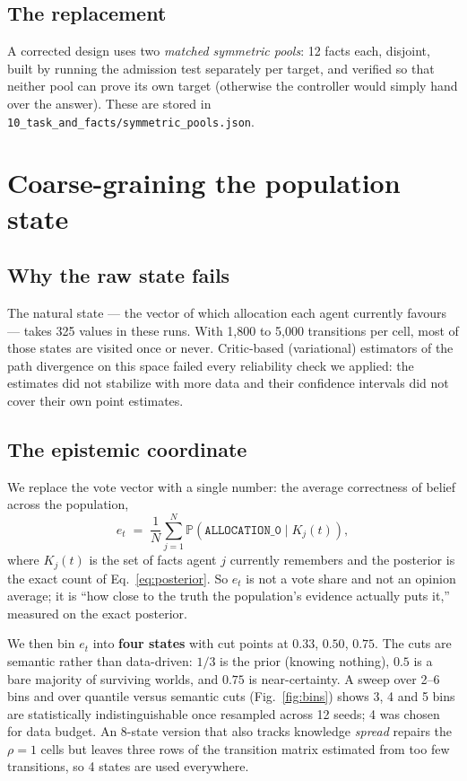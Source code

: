 \documentclass[11pt,a4paper]{article}
\newcommand{\Prob}{\mathbb{P}}
\newcommand{\A}[1]{\texttt{ALLOCATION\_#1}}
\begin{document}
\subsection{The replacement}

A corrected design uses two \emph{matched symmetric pools}: 12 facts each,
disjoint, built by running the admission test separately per target, and
verified so that neither pool can prove its own target (otherwise the controller
would simply hand over the answer). These are stored in
\texttt{10\_task\_and\_facts/symmetric\_pools.json}.

\section{Coarse-graining the population state}

\subsection{Why the raw state fails}

The natural state --- the vector of which allocation each agent currently
favours --- takes 325 values in these runs. With 1{,}800 to 5{,}000 transitions
per cell, most of those states are visited once or never. Critic-based
(variational) estimators of the path divergence on this space failed every
reliability check we applied: the estimates did not stabilize with more data and
their confidence intervals did not cover their own point estimates.

\subsection{The epistemic coordinate}

We replace the vote vector with a single number: the average correctness of
belief across the population,
\begin{equation}
  e_t \;=\; \frac{1}{N}\sum_{j=1}^{N} \Prob\!\left(\A{0} \mid K_j(t)\right),
  \label{eq:ecoord}
\end{equation}
where $K_j(t)$ is the set of facts agent $j$ currently remembers and the
posterior is the exact count of Eq.~\eqref{eq:posterior}. So $e_t$ is not a
vote share and not an opinion average; it is ``how close to the truth the
population's evidence actually puts it,'' measured on the exact posterior.

We then bin $e_t$ into \textbf{four states} with cut points at
$0.33$, $0.50$, $0.75$. The cuts are semantic rather than data-driven: $1/3$ is
the prior (knowing nothing), $0.5$ is a bare majority of surviving worlds, and
$0.75$ is near-certainty. A sweep over 2--6 bins and over quantile versus
semantic cuts (Fig.~\ref{fig:bins}) shows 3, 4 and 5 bins are statistically
indistinguishable once resampled across 12 seeds; 4 was chosen for data budget.
An 8-state version that also tracks knowledge \emph{spread} repairs the
$\rho = 1$ cells but leaves three rows of the transition matrix estimated from
too few transitions, so 4 states are used everywhere.
\end{document}
